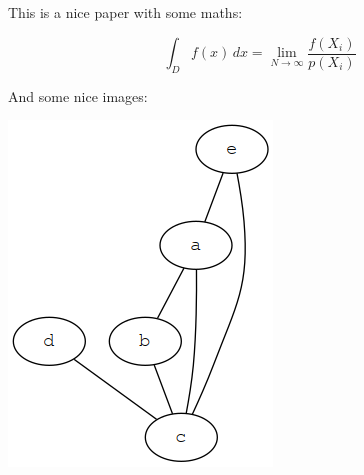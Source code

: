 \documentclass{article}
\begin{document}
This is a nice paper with some maths:

\begin{equation}
\int _ D f(x) \,dx = \lim _ {N \to \infty} \frac {f(X_i)} {p(X_i)}
\end{equation}

And some nice images:

\includegraphics{graph.png}
\end{document}
